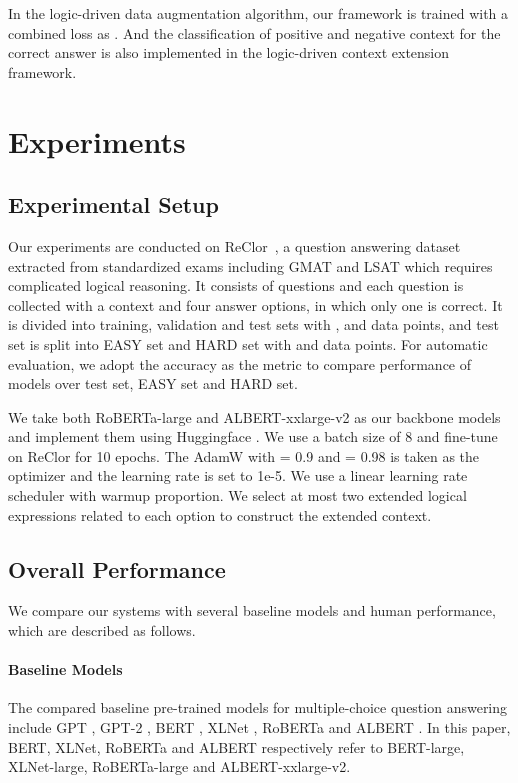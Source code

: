 \documentclass[11pt,a4paper]{article}
\begin{document}
In the logic-driven data augmentation algorithm, our framework is trained with a combined loss as . And the classification of positive and negative context for the correct answer is also implemented in the logic-driven context extension framework.


\section{Experiments}
\subsection{Experimental Setup}
Our experiments are conducted on ReClor~\cite{yu2020reclor}, a question answering dataset extracted from standardized exams including GMAT and LSAT which requires complicated logical reasoning. It consists of  questions and each question is collected with a context and four answer options, in which only one is correct. It is divided into training, validation and test sets with ,  and  data points, and test set is split into EASY set and HARD set with  and  data points. For automatic evaluation, we adopt the accuracy as the metric to compare performance of models over test set, EASY set and HARD set.
 
We take both RoBERTa-large \cite{liu2019roberta} and ALBERT-xxlarge-v2 \cite{lan2019albert} as our backbone models and implement them using Huggingface \cite{wolf2019huggingface}. We use a batch size of 8 and fine-tune on ReClor for 10 epochs. The AdamW \cite{loshchilov2018fixing} with  = 0.9 and  = 0.98 is taken as the optimizer and the learning rate is set to 1e-5. We use a linear learning rate scheduler with  warmup proportion.
We select at most two extended logical expressions related to each option to construct the extended context. 


\subsection{Overall Performance}
We compare our systems with several baseline models and human performance, which are described as follows.
\paragraph{Baseline Models} The compared baseline pre-trained models for multiple-choice question answering include GPT \cite{radford2018improving}, GPT-2 \cite{radford2019language}, BERT \cite{devlin2019bert}, XLNet \cite{yang2019xlnet}, RoBERTa \cite{liu2019roberta} and ALBERT \cite{lan2019albert}. In this paper, BERT, XLNet, RoBERTa and ALBERT respectively refer to BERT-large, XLNet-large, RoBERTa-large and ALBERT-xxlarge-v2.
\end{document}
